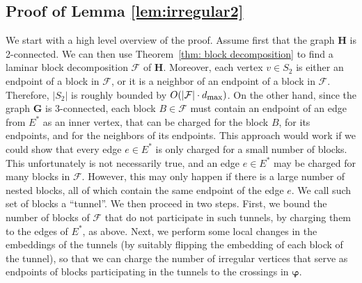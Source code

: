 \documentclass[twoside,leqno,twocolumn]{article}
\newcommand{\fset}{{\mathcal{F}}}
\newcommand{\dmax}{d_{\mbox{\textup{\footnotesize{max}}}}}
\newcommand{\G}{{\mathbf{G}}}
\renewcommand{\H}{{\mathbf{H}}}
\newcommand{\bphi}{{\boldsymbol{\varphi}}}
\begin{document}
\subsection{Proof of Lemma \ref{lem:irregular2}} 
We start with a high level overview of the proof. Assume first that the graph $\H$ is 2-connected. We can then use Theorem~\ref{thm: block decomposition} to find a laminar block decomposition $\fset$ of $\H$. Moreover, each vertex $v\in S_2$ is either an endpoint of a block in $\fset$, or it is a neighbor of an endpoint of a block in $\fset$. Therefore, $|S_2|$ is roughly bounded by $O(|\fset|\cdot \dmax)$. On the other hand, since the graph $\G$ is 3-connected, each block $B\in \fset$ must contain an endpoint of an edge from $E^*$ as an inner vertex, that can be charged for the block $B$, for its endpoints, and for the neighbors of its endpoints. This approach would work if we could show that every edge $e\in E^*$ is only charged for a small number of blocks. This unfortunately is not necessarily true, and an edge $e\in E^*$ may be charged for many blocks in $\fset$. However, this may only happen if there is a large number of nested blocks, all of which contain the same endpoint of the edge $e$. We call such set of blocks a ``tunnel''. We then proceed in two steps. First, we bound the number of blocks of $\fset$ that do not participate in such tunnels, by charging them to the edges of $E^*$, as above. Next, we perform some local changes in the embeddings of the tunnels (by suitably flipping the embedding of each block of the tunnel), so that we can charge the number of irregular vertices that serve as endpoints of blocks participating in the tunnels to the crossings in $\bphi$.
\end{document}
